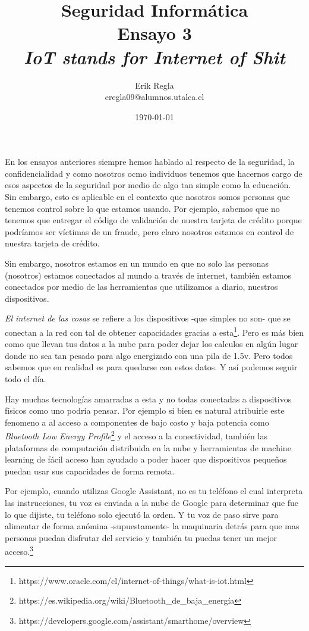 \documentclass[11pt]{utalcaDoc}
\title{{\bf Seguridad Informática}\\ Ensayo 3 \\\textit{IoT stands for Internet of Shit}}
\author{Erik Regla\\ eregla09@alumnos.utalca.cl}
\date{\today}
\begin{document}
\maketitle

En los ensayos anteriores siempre hemos hablado al respecto de la seguridad, la confidencialidad y como nosotros ocmo individuos tenemos que hacernos cargo de esos aspectos de la seguridad por medio de algo tan simple como la educación. Sin embargo, esto es aplicable en el contexto que nosotros somos personas que tenemos control sobre lo que estamos usando. Por ejemplo, sabemos que no tenemos que entregar el código de validación de nuestra tarjeta de crédito porque podríamos ser víctimas de un fraude, pero claro nosotros estamos en control de nuestra tarjeta de crédito.

Sin embargo, nosotros estamos en un mundo en que no solo las personas (nosotros) estamos conectados al mundo a través de internet, también estamos conectados por medio de las herramientas que utilizamos a diario, nuestros dispositivos.

\textit{El internet de las cosas} se refiere a los dispositivos -que simples no son- que se conectan a la red con tal de obtener capacidades gracias a esta\footnote{https://www.oracle.com/cl/internet-of-things/what-is-iot.html}. Pero es más bien como que llevan tus datos a la nube para poder dejar los calculos en algún lugar donde no sea tan pesado para algo energizado con una pila de 1.5v. Pero todos sabemos que en realidad es para quedarse con estos datos. Y así podemos seguir todo el día.

Hay muchas tecnologías amarradas a esta y no todas conectadas a dispositivos físicos como uno podría pensar. Por ejemplo si bien es natural atribuirle este fenomeno a al acceso a componentes de bajo costo y baja potencia como \textit{Bluetooth Low Energy Profile}\footnote{https://es.wikipedia.org/wiki/Bluetooth_de_baja_energía} y el acceso a la conectividad, también las plataformas de computación distribuida en la nube y herramientas de machine learning de fácil acceso han ayudado a poder hacer que dispositivos pequeños puedan usar sus capacidades de forma remota.

Por ejemplo, cuando utilizas Google Assistant, no es tu teléfono el cual interpreta las instrucciones, tu voz es enviada a la nube de Google para determinar que fue lo que dijiste, tu teléfono solo ejecutó la orden. Y tu voz de paso sirve para alimentar de forma anómina -supuestamente- la maquinaria detrás para que mas personas puedan disfrutar del servicio y también tu puedas tener un mejor acceso.\footnote{https://developers.google.com/assistant/smarthome/overview}
\end{document}

